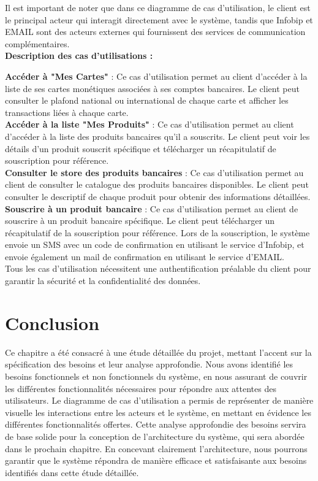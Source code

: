 Il est important de noter que dans ce diagramme de cas d'utilisation, le client est le principal acteur qui interagit directement avec le système, tandis que Infobip et EMAIL sont des acteurs externes qui fournissent des services de communication complémentaires.\\

\textbf{\large{Description des cas d’utilisations :}\\}

\textbf{Accéder à "Mes Cartes"} : Ce cas d'utilisation permet au client d'accéder à la liste de ses cartes monétiques associées à ses comptes bancaires. Le client peut consulter le plafond national ou international de chaque carte et afficher les transactions liées à chaque carte.\\

\textbf{Accéder à la liste "Mes Produits"} : Ce cas d'utilisation permet au client d'accéder à la liste des produits bancaires qu'il a souscrits. Le client peut voir les détails d'un produit souscrit spécifique et télécharger un récapitulatif de souscription pour référence.\\

\textbf{Consulter le store des produits bancaires} : Ce cas d'utilisation permet au client de consulter le catalogue des produits bancaires disponibles. Le client peut consulter le descriptif de chaque produit pour obtenir des informations détaillées.\\

\textbf{Souscrire à un produit bancaire} : Ce cas d'utilisation permet au client de souscrire à un produit bancaire spécifique. Le client peut télécharger un récapitulatif de la souscription pour référence. Lors de la souscription, le système envoie un SMS avec un code de confirmation en utilisant le service d'Infobip, et envoie également un mail de confirmation en utilisant le service d'EMAIL.\\

Tous les cas d'utilisation nécessitent une authentification préalable du client pour garantir la sécurité et la confidentialité des données.

\section{Conclusion}
Ce chapitre a été consacré à une étude détaillée du projet, mettant l'accent sur la spécification des besoins et leur analyse approfondie. Nous avons identifié les besoins fonctionnels et non fonctionnels du système, en nous assurant de couvrir les différentes fonctionnalités nécessaires pour répondre aux attentes des utilisateurs. Le diagramme de cas d'utilisation a permis de représenter de manière visuelle les interactions entre les acteurs et le système, en mettant en évidence les différentes fonctionnalités offertes. Cette analyse approfondie des besoins servira de base solide pour la conception de l'architecture du système, qui sera abordée dans le prochain chapitre. En concevant clairement l'architecture, nous pourrons garantir que le système répondra de manière efficace et satisfaisante aux besoins identifiés dans cette étude détaillée.